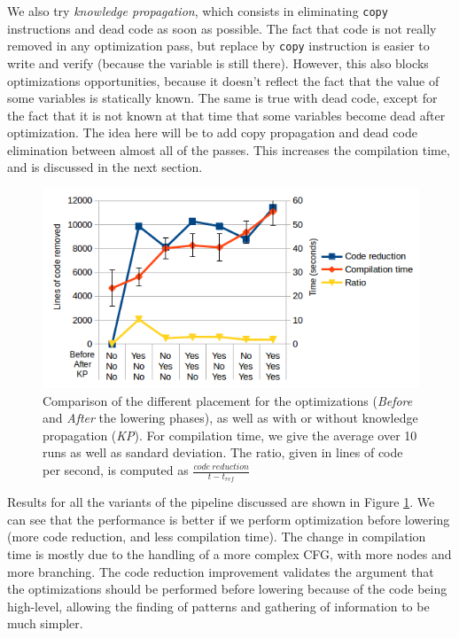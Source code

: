 \documentclass[11pt,a4paper]{article}
\newcommand{\nir}[1]{\texttt{#1}}
\begin{document}
We also try \textit{knowledge propagation}, which consists in eliminating \nir{copy} instructions and dead code as soon as possible. The fact that code is not really removed in any optimization pass, but replace by \nir{copy} instruction is easier to write and verify (because the variable is still there). However, this also blocks optimizations opportunities, because it doesn't reflect the fact that the value of some variables is statically known. The same is true with dead code, except for the fact that it is not known at that time that some variables become dead after optimization. The idea here will be to add copy propagation and dead code elimination between almost all of the passes. This increases the compilation time, and is discussed in the next section.

\begin{figure}
	\includegraphics[width=1.15\textwidth]{images/integration-side.png}
	\caption{Comparison of the different placement for the optimizations (\textit{Before} and \textit{After} the lowering phases), as well as with or without knowledge propagation (\textit{KP}). For compilation time, we give the average over 10 runs as well as sandard deviation. The ratio, given in lines of code per second, is computed as $\frac{code\ reduction}{t - t_{ref}}$}
	\label{fig:pipinteg}
\end{figure}

Results for all the variants of the pipeline discussed are shown in Figure \ref{fig:pipinteg}. We can see that the performance is better if we perform optimization before lowering (more code reduction, and less compilation time). The change in compilation time is mostly due to the handling of a more complex CFG, with more nodes and more branching. The code reduction improvement validates the argument that the optimizations should be performed before lowering because of the code being high-level, allowing the finding of patterns and gathering of information to be much simpler.
\end{document}
